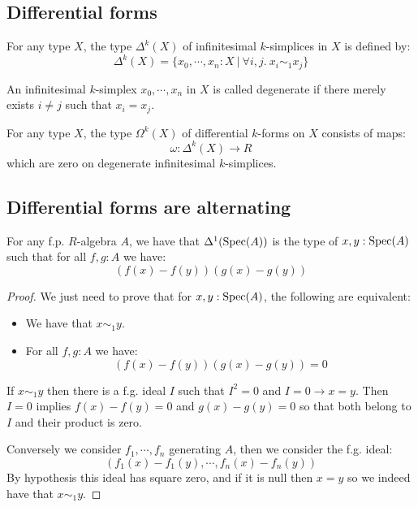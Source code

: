 \subsection{Differential forms}

\begin{definition}
For any type $X$, the type $\Delta^k(X)$ of infinitesimal $k$-simplices in $X$ is defined by:
\[\Delta^k(X) = \{x_0,\cdots,x_n:X\ 
|\ \forall i,j.\ x_i\sim_1x_j\}\]
\end{definition}

\begin{definition}
An infinitesimal $k$-simplex $x_0,\cdots,x_n$ in $X$ is called degenerate if there merely exists $i\not= j$ such that $x_i=x_j$. 
\end{definition}

\begin{definition}
For any type $X$, the type $\Omega^k(X)$ of differential $k$-forms on $X$ consists of maps:
\[\omega:\Delta^k(X)\to R\]
which are zero on degenerate infinitesimal $k$-simplices.
\end{definition}

\subsection{Differential forms are alternating}

\begin{lemma}\label{first-order-functions}
For any f.p. $R$-algebra $A$, we have that $\Delta^1(\operatorname{Spec}(A))$ is the type of $x,y:\operatorname{Spec}(A)$ such that for all $f,g:A$ we have:
\[(f(x)-f(y))(g(x)-g(y))\]
\end{lemma}

\begin{proof}
We just need to prove that for $x,y:\operatorname{Spec}(A)$, the following are equivalent:
\begin{itemize}
\item We have that $x\sim_1y$.
\item For all $f,g:A$ we have:
\[(f(x)-f(y))(g(x)-g(y)) = 0\]
\end{itemize}
If $x\sim_1y$ then there is a f.g. ideal $I$ such that $I^2=0$ and $I=0\to x=y$. Then $I=0$ implies $f(x)-f(y)=0$ and $g(x)-g(y)=0$ so that both belong to $I$ and their product is zero.

Conversely we consider $f_1,\cdots,f_n$ generating $A$, then we consider the f.g. ideal:
\[(f_1(x)-f_1(y),\cdots,f_n(x)-f_n(y))\]
By hypothesis this ideal has square zero, and if it is null then $x=y$ so we indeed have that $x\sim_1y$. 
\end{proof}

